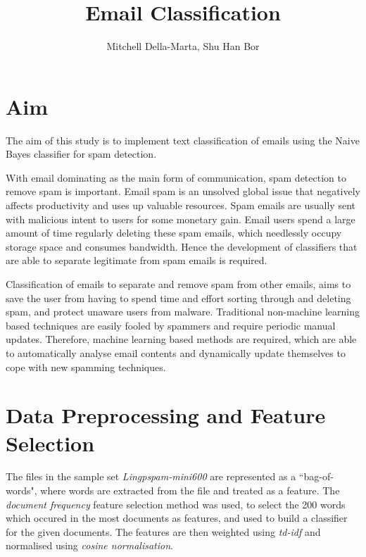 \documentclass[10pt, a4paper]{article}
\title{Email Classification}
\author{Mitchell Della-Marta, Shu Han Bor}
\date{}
\begin{document}
\maketitle

\section{Aim}

The aim of this study is to implement text classification of emails using the Naive Bayes classifier for spam detection.

With email dominating as the main form of communication, spam detection to remove spam is important. Email spam is an unsolved global issue that negatively affects productivity and uses up valuable resources. Spam emails are usually sent with malicious intent to users for some monetary gain. Email users spend a large amount of time regularly deleting these spam emails, which needlessly occupy storage space and consumes bandwidth. Hence the development of classifiers that are able to separate legitimate from spam emails is required.

Classification of emails to separate and remove spam from other emails, aims to save the user from having to spend time and effort sorting through and deleting spam, and protect unaware users from malware. Traditional non-machine learning based techniques are easily fooled by spammers and require periodic manual updates. Therefore, machine learning based methods are required, which are able to automatically analyse email contents and dynamically update themselves to cope with new spamming techniques.

\section{Data Preprocessing and Feature Selection}

The files in the sample set \emph{Lingpspam-mini600} are represented as a ``bag-of-words", where words are extracted from the file and treated as a feature. The \emph{document frequency} feature selection method was used, to select the 200 words which occured in the most documents as features, and used to build a classifier for the given documents. The features are then weighted using \emph{td-idf} and normalised using \emph{cosine normalisation}.
\end{document}
